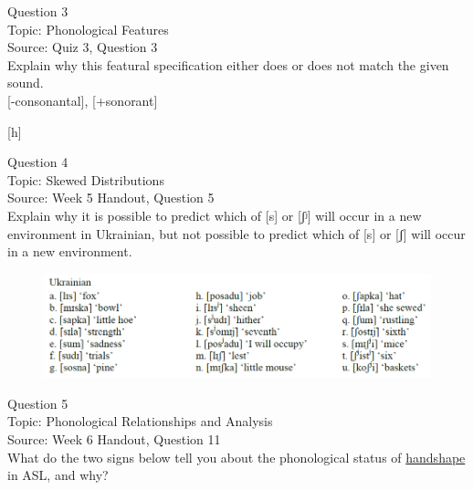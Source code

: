 \documentclass[12pt]{article}
\begin{document}
\newpage

{\large Question 3}\\

Topic: Phonological Features\\
Source: Quiz 3, Question 3\\

Explain why this featural specification either does or does not match the given sound.\\

{[-consonantal]}, {[+sonorant]}

{[h]}


\newpage

{\large Question 4}\\

Topic: Skewed Distributions\\
Source: Week 5 Handout, Question 5\\

Explain why it is possible to predict which of [s] or [ʃʲ] will occur in a new environment in Ukrainian, but not possible to predict which of [s] or [ʃ] will occur in a new environment.\\

\begin{figure}[H]
\includegraphics{../images/ukrainian.png}
\end{figure}

\newpage

{\large Question 5}\\

Topic: Phonological Relationships and Analysis\\
Source: Week 6 Handout, Question 11\\

What do the two signs below tell you about the phonological status of \underline{handshape} in ASL, and why?\\
\end{document}
